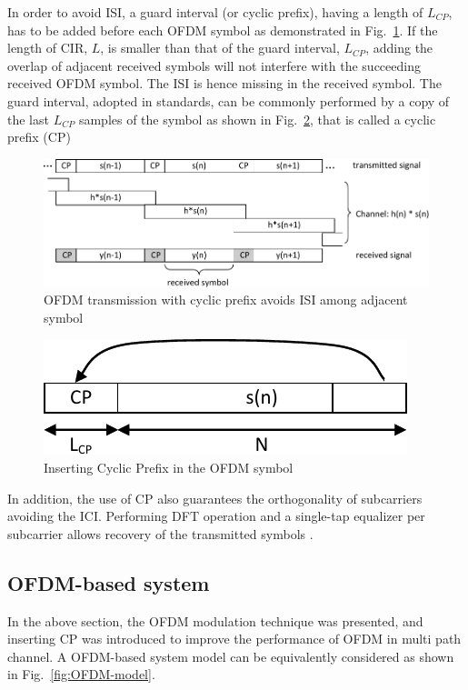 In order to avoid ISI, a guard interval (or cyclic prefix), having a length of $L_{CP}$, has to be added before each OFDM symbol as demonstrated in Fig.~\ref{fig:CIR-CP}. 
If the length of CIR, $L$, is smaller than that of the guard interval, $L_{CP}$, adding the overlap of adjacent received symbols will not interfere with the succeeding received OFDM symbol. 
The ISI is hence missing in the received symbol.  
The guard interval, adopted in standards, can be commonly performed by a copy of the last $L_{CP}$ samples of the symbol as shown in Fig.~\ref{fig:CP}, that is called a cyclic prefix (CP)

\begin{figure}
	\centerline{\includegraphics [width=0.8\columnwidth] {Figures/CIR_CP.pdf} }
	\caption{OFDM transmission with cyclic prefix avoids ISI among adjacent symbol}
	\label{fig:CIR-CP}
\end{figure}

\begin{figure}
	\centerline{\includegraphics [width=0.8\columnwidth] {Figures/CP.pdf} }
	\caption{Inserting Cyclic Prefix in the OFDM symbol}
	\label{fig:CP}
\end{figure}

In addition, the use of CP also guarantees the orthogonality of subcarriers avoiding the ICI. Performing DFT operation and a single-tap equalizer per subcarrier allows recovery of the transmitted symbols \cite{farhang2008signal}. 

\subsection{OFDM-based system}
In the above section, the OFDM modulation technique was presented, and inserting CP was introduced to improve the performance of OFDM in multi path channel. 
A OFDM-based system model can be equivalently considered as shown in Fig.~\ref{fig:OFDM-model}.

